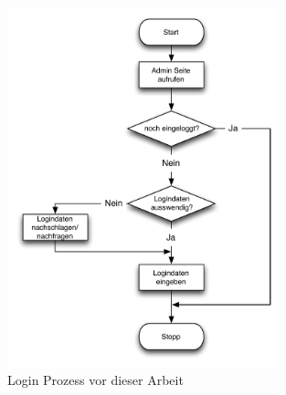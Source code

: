 \begin{figure}
		\includegraphics[width=0.70\textwidth]{include/login_before.pdf}
		\caption{Login Prozess vor dieser Arbeit}
		\label{fig:login-before}
\end{figure}
